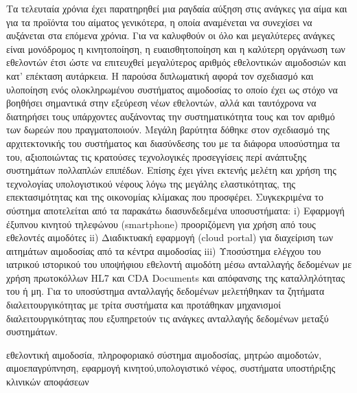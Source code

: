 \begin{abstractgr}
	Τα τελευταία χρόνια έχει παρατηρηθεί μια ραγδαία αύξηση στις ανάγκες για αίμα και για τα προϊόντα του αίματος γενικότερα, η οποία αναμένεται να συνεχίσει να αυξάνεται στα επόμενα χρόνια. Για να καλυφθούν οι όλο και μεγαλύτερες ανάγκες είναι μονόδρομος η κινητοποίηση, η ευαισθητοποίηση και η καλύτερη οργάνωση των εθελοντών έτσι ώστε να επιτευχθεί μεγαλύτερος αριθμός εθελοντικών αιμοδοσιών και κατ' επέκταση αυτάρκεια. Η παρούσα διπλωματική αφορά τον σχεδιασμό και υλοποίηση ενός ολοκληρωμένου συστήματος αιμοδοσίας το οποίο έχει ως στόχο να βοηθήσει σημαντικά στην εξεύρεση νέων εθελοντών, αλλά και ταυτόχρονα να διατηρήσει τους υπάρχοντες αυξάνοντας την συστηματικότητα τους και τον αριθμό των δωρεών που πραγματοποιούν. Μεγάλη βαρύτητα δόθηκε στον σχεδιασμό της αρχιτεκτονικής του συστήματος και διασύνδεσης του με τα διάφορα υποσύστημα τα του, αξιοποιώντας τις κρατούσες
τεχνολογικές προσεγγίσεις περί ανάπτυξης συστημάτων πολλαπλών επιπέδων. Επίσης έχει γίνει εκτενής μελέτη και χρήση της τεχνολογίας υπολογιστικού νέφους λόγω της μεγάλης ελαστικότητας, της επεκτασιμότητας και της οικονομίας κλίμακας που προσφέρει.  Συγκεκριμένα το σύστημα αποτελείται από τα παρακάτω διασυνδεδεμένα υποσυστήματα: i) Εφαρμογή έξυπνου κινητού τηλεφώνου (smartphone) προοριζόμενη για χρήση από τους εθελοντές αιμοδότες ii) Διαδικτυακή εφαρμογή (cloud portal) για διαχείριση των αιτημάτων αιμοδοσίας από τα κέντρα αιμοδοσίας  iii) Υποσύστημα ελέγχου του ιατρικού ιστορικού  του υποψήφιου εθελοντή αιμοδότη μέσω ανταλλαγής δεδομένων με χρήση πρωτοκόλλων HL7 και CDA Documents και απόφανσης της καταλληλότητας του ή μη. Για το υποσύστημα ανταλλαγής δεδομένων μελετήθηκαν τα ζητήματα διαλειτουργικότητας με τρίτα συστήματα και προτάθηκαν μηχανισμοί διαλειτουργικότητας που εξυπηρετούν τις ανάγκες ανταλλαγής δεδομένων μεταξύ συστημάτων.
    \begin{keywordsgr}
		εθελοντική αιμοδοσία, πληροφοριακό σύστημα αιμοδοσίας, μητρώο αιμοδοτών, αιμοεπαγρύπνηση, εφαρμογή κινητού,υπολογιστικό νέφος, συστήματα υποστήριξης κλινικών αποφάσεων
	\end{keywordsgr}
\end{abstractgr}

\begin{abstracten}
	\begin{keywordsen}
	\end{keywordsen}
\end{abstracten}


